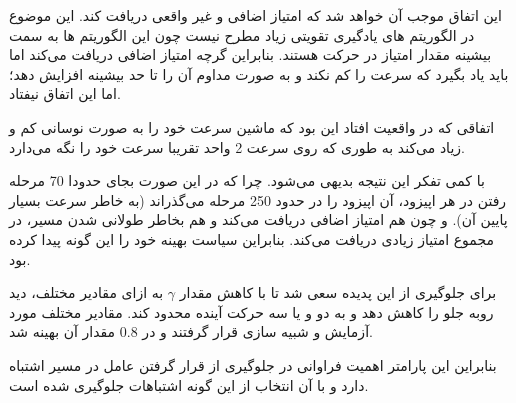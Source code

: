 این اتفاق موجب آن خواهد شد که امتیاز اضافی و غیر واقعی دریافت کند. این موضوع در الگوریتم های یادگیری تقویتی زیاد مطرح نیست چون این الگوریتم ها به سمت بیشینه مقدار امتیاز در حرکت هستند. بنابراین گرچه امتیاز اضافی دریافت می‌کند اما باید یاد بگیرد که سرعت را کم نکند و به صورت مداوم آن را تا حد بیشینه افزایش دهد؛ اما این اتفاق نیفتاد.


اتفاقی که در واقعیت افتاد این بود که ماشین سرعت خود را به صورت نوسانی کم و زیاد می‌کند به طوری که روی سرعت 2 واحد تقریبا سرعت خود را نگه می‌دارد. 

با کمی تفکر این نتیجه بدیهی می‌شود. چرا که در این صورت بجای حدودا 70 مرحله رفتن در هر اپیزود، آن اپیزود را در حدود 250 مرحله می‌گذراند (به خاطر سرعت بسیار پایین آن).  و چون هم امتیاز اضافی دریافت می‌کند و هم بخاطر طولانی شدن مسیر، در مجموع امتیاز زیادی دریافت می‌کند. بنابراین سیاست بهینه خود را این گونه پیدا کرده بود.

برای جلوگیری از این پدیده سعی شد تا با کاهش مقدار $\gamma$ به ازای مقادیر مختلف، دید روبه جلو را کاهش دهد و به دو و یا سه حرکت آینده محدود کند. مقادیر مختلف مورد آزمایش و شبیه سازی قرار گرفتند و در $0.8$ مقدار آن بهینه شد. 

بنابراین این پارامتر اهمیت فراوانی در جلوگیری از قرار گرفتن عامل در مسیر اشتباه دارد و با آن انتخاب از این گونه اشتباهات جلوگیری شده است.







